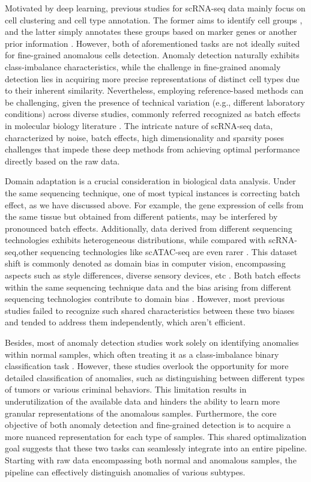 \documentclass{article}
\begin{document}
Motivated by deep learning, previous studies for scRNA-seq data mainly focus on cell 
clustering and cell type annotation. The former aims to identify cell groups \cite{sczi-Desk,scCNC},
and the latter simply annotates these groups based on marker genes or another prior information \cite{ItClust,scArches}. 
However, both of aforementioned tasks are not ideally suited for fine-grained anomalous cells detection. 
Anomaly detection naturally exhibits class-imbalance characteristics, while the challenge 
in fine-grained anomaly detection lies in acquiring more precise representations of distinct cell types 
due to their inherent similarity. Nevertheless, employing reference-based methods can be challenging, given the presence of 
technical variation (e.g., different laboratory conditions) across diverse studies, 
commonly referred recognized as batch effects in molecular biology literature \cite{Polyphony}. 
The intricate nature of scRNA-seq data, characterized by noise, batch effects, high 
dimensionality and sparsity \cite{dands} poses challenges that impede these deep 
methods from achieving optimal performance directly based on the raw data.

Domain adaptation is a crucial consideration in biological data analysis. Under the same sequencing technique, one of most 
typical instances is correcting batch effect, as we have discussed above. For example, the gene expression of cells from 
the same tissue but obtained from different patients, may be interfered by pronounced batch effects. 
Additionally, data derived from different sequencing technologies exhibits heterogeneous distributions, while 
compared with scRNA-seq,other sequencing technologies like scATAC-seq are even rarer \cite{RNAmore}.
This dataset shift is commonly denoted as domain bias in computer vision, encompassing aspects 
such as style differences, diverse sensory devices, etc \cite{domainada}.
Both batch effects within the same sequencing technique data and the bias arising from different 
sequencing technologies contribute to domain bias \cite{ACE}. However, most previous studies failed to 
recognize such shared characteristics between these two biases and tended to address them 
independently, which aren't efficient.

Besides, most of anomaly detection studies work solely on identifying anomalies within normal 
samples, which often treating it as a class-imbalance binary classification task \cite{OA}. 
However, these studies overlook the opportunity for more detailed classification of 
anomalies, such as distinguishing between different types of tumors or various criminal 
behaviors. This limitation results in underutilization of the available data and hinders 
the ability to learn more granular representations of the anomalous samples. 
Furthermore, the core objective of both anomaly detection and fine-grained detection is to 
acquire a more nuanced representation for each type of samples. This shared optimalization 
goal suggests that these two tasks can seamlessly integrate into an entire pipeline. 
Starting with raw data encompassing both normal and anomalous samples, the pipeline can 
effectively distinguish anomalies of various subtypes.
\end{document}
